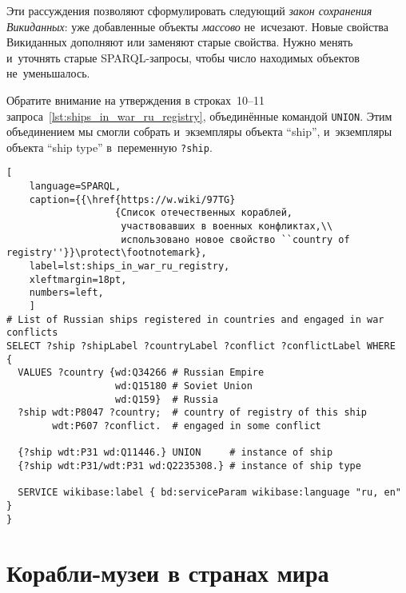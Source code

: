 Эти рассуждения позволяют сформулировать следующий \emph{закон сохранения Викиданных}: 
уже добавленные объекты \emph{массово} не~исчезают. 
Новые свойства Викиданных дополняют или заменяют старые свойства. 
Нужно менять и~уточнять старые SPARQL-запросы, чтобы число находимых объектов не~уменьшалось.

Обратите внимание на утверждения в строках~10--11 запроса~\ref{lst:ships_in_war_ru_registry}, 
объединённые командой \lstinline{UNION}. 
Этим объединением мы смогли собрать и~экземпляры объекта ``ship'', 
и~экземпляры объекта ``ship type'' в~переменную \lstinline|?ship|.


\begin{lstlisting}[ 
    language=SPARQL, 
    caption={{\href{https://w.wiki/97TG}
                   {Список отечественных кораблей, 
                    участвовавших в военных конфликтах,\\
                    использовано новое свойство ``country of registry''}}\protect\footnotemark}, 
    label=lst:ships_in_war_ru_registry,
    xleftmargin=18pt, 
    numbers=left,
    ]
# List of Russian ships registered in countries and engaged in war conflicts
SELECT ?ship ?shipLabel ?countryLabel ?conflict ?conflictLabel WHERE
{
  VALUES ?country {wd:Q34266 # Russian Empire
                   wd:Q15180 # Soviet Union
                   wd:Q159}  # Russia
  ?ship wdt:P8047 ?country;  # country of registry of this ship
        wdt:P607 ?conflict.  # engaged in some conflict
  
  {?ship wdt:P31 wd:Q11446.} UNION     # instance of ship
  {?ship wdt:P31/wdt:P31 wd:Q2235308.} # instance of ship type
  
  SERVICE wikibase:label { bd:serviceParam wikibase:language "ru, en" }
}
\end{lstlisting}













\section{Корабли-музеи в странах мира}


